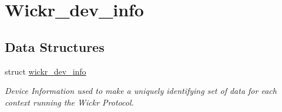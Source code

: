 \hypertarget{group__wickr__dev__info}{}\section{Wickr\+\_\+dev\+\_\+info}
\label{group__wickr__dev__info}
\subsection*{Data Structures}
\begin{DoxyCompactItemize}
\item 
struct \hyperlink{structwickr__dev__info}{wickr\+\_\+dev\+\_\+info}
\begin{DoxyCompactList}\small\item\em Device Information used to make a uniquely identifying set of data for each context running the Wickr Protocol. \end{DoxyCompactList}\end{DoxyCompactItemize}
